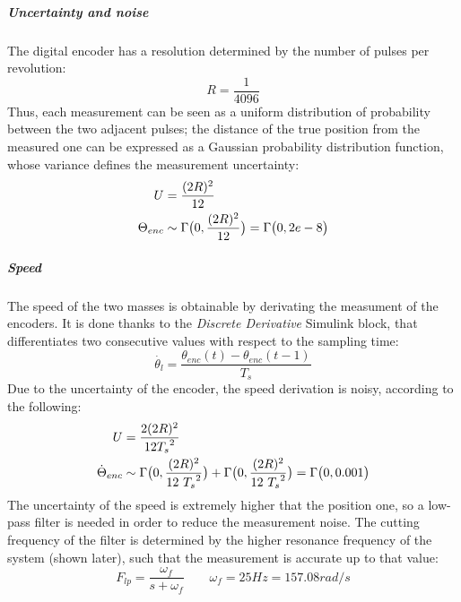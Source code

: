 \subparagraph{Uncertainty and noise}

The digital encoder has a resolution determined by the number of pulses per revolution:
\[
	R = \frac{1}{4096}
\]
Thus, each measurement can be seen as a uniform distribution of probability between the two adjacent pulses; the distance of the true position from the measured one can be expressed as a Gaussian probability distribution function, whose variance defines the measurement uncertainty:
\begin{align*}
	U &= \frac{(2R)^2}{12} \\
	\Theta_{enc} &\sim \Gamma \bigl{(} 0,\frac{(2R)^2}{12} \bigr{)} = \Gamma \bigl{(} 0, 2e-8 \bigr{)}
\end{align*}

\subparagraph{Speed}

The speed of the two masses is obtainable by derivating the measument of the encoders. It is done thanks to the \textit{Discrete Derivative} Simulink block, that differentiates two consecutive values with respect to the sampling time:
\[
	\dot{\theta_l} = \frac{ \theta_{enc}(t) - \theta_{enc}(t-1)}{T_s}
\]
Due to the uncertainty of the encoder, the speed derivation is noisy, according to the following:
\begin{align*}
	U &= \frac{2(2R)^2}{12 {T_s}^2 } \\
	\dot{\Theta}_{enc}	&\sim \Gamma \bigl{(} 0,\frac{(2R)^2}{12 \ {T_s}^2} \bigr{)} + \Gamma \bigl{(} 0,\frac{(2R)^2}{12 \ {T_s}^2} \bigr{)} = \Gamma \bigl{(} 0, 0.001 \bigr{)}
\end{align*}
The uncertainty of the speed is extremely higher that the position one, so a low-pass filter is needed in order to reduce the measurement noise. The cutting frequency of the filter is determined by the higher resonance frequency of the system (shown later), such that the measurement is accurate up to that value:
\[
	F_{lp} = \frac{ \omega_f }{ s+\omega_f} \qquad \omega_f=25Hz=157.08 rad/s
\]